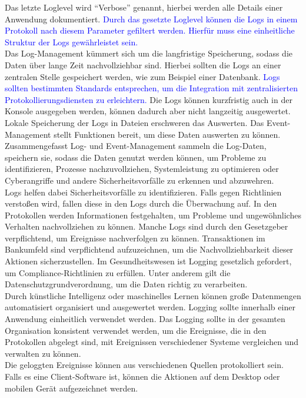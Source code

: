 Das letzte Loglevel wird \enquote{Verbose} genannt, hierbei werden alle Details einer Anwendung dokumentiert.
\textcolor{blue}{Durch das gesetzte Loglevel können die Logs in einem Protokoll nach diesem Parameter gefiltert werden.
Hierfür muss eine einheitliche Struktur der Logs gewährleistet sein.}
\\
Das Log-Management kümmert sich um die langfristige Speicherung, sodass die Daten über lange Zeit nachvollziehbar sind.
Hierbei sollten die Logs an einer zentralen Stelle gespeichert werden, wie zum Beispiel einer Datenbank.
\textcolor{blue}{Logs sollten bestimmten Standards entsprechen, um die Integration mit zentralisierten Protokollierungsdiensten zu erleichtern.}
Die Logs können kurzfristig auch in der Konsole ausgegeben werden, können dadurch aber nicht langzeitig ausgewertet.
Lokale Speicherung der Logs in Dateien erschweren das Auswerten.
Das Event-Management stellt Funktionen bereit, um diese Daten auswerten zu können.
Zusammengefasst Log- und Event-Management sammeln die Log-Daten, speichern sie, sodass die Daten genutzt werden können, um Probleme zu identifizieren, Prozesse nachzuvollziehen, Systemleistung zu optimieren oder Cyberangriffe und andere Sicherheitsvorfälle zu erkennen und abzuwehren.
\\
Logs helfen dabei Sicherheitsvorfälle zu identifizieren.
Falls gegen Richtlinien verstoßen wird, fallen diese in den Logs durch die Überwachung auf.
In den Protokollen werden Informationen festgehalten, um Probleme und ungewöhnliches Verhalten nachvollziehen zu können.
Manche Logs sind durch den Gesetzgeber verpflichtend, um Ereignisse nachverfolgen zu können.
Transaktionen im Bankumfeld sind verpflichtend aufzuzeichnen, um die Nachvollziehbarkeit dieser Aktionen sicherzustellen.
Im Gesundheitswesen ist Logging gesetzlich gefordert, um Compliance-Richtlinien zu erfüllen.
Unter anderem gilt die Datenschutzgrundverordnung, um die Daten richtig zu verarbeiten.
\\
Durch künstliche Intelligenz oder maschinelles Lernen können große Datenmengen automatisiert organisiert und ausgewertet werden.
Logging sollte innerhalb einer Anwendung einheitlich verwendet werden.
Das Logging sollte in der gesamten Organisation konsistent verwendet werden, um die Ereignisse, die in den Protokollen abgelegt sind, mit Ereignissen verschiedener Systeme vergleichen und verwalten zu können.
\\
Die geloggten Ereignisse können aus verschiedenen Quellen protokolliert sein.
Falls es eine Client-Software ist, können die Aktionen auf dem Desktop oder mobilen Gerät aufgezeichnet werden.

